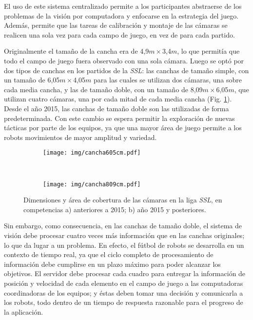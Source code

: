 El uso de este sistema centralizado permite a los participantes abstraerse de
los problemas de la visión por computadora y enfocarse en la estrategia del
juego. Además, permite que las tareas de calibración y montaje de las cámaras se
realicen una sola vez para cada campo de juego, en vez de para cada partido.

Originalmente el tamaño de la cancha era de 4,9$m\times$3,4$m$, lo que permitía
que todo el campo de juego fuera observado con una sola cámara. Luego se optó
por dos tipos de canchas en los partidos de la \emph{SSL}: las canchas de tamaño
simple, con un tamaño de 6,05$m\times$4,05$m$ para las cuales se utilizan dos
cámaras, una sobre cada media cancha, y las de tamaño doble, con un tamaño de
8,09$m\times$6,05$m$, que utilizan cuatro cámaras, una por cada mitad de cada
media cancha (Fig. \ref{cancha}). Desde el año 2015, las canchas de tamaño doble
son las utilizadas de forma predeterminada\cite{sslrules2015}. Con este cambio
se espera permitir la exploración de nuevas tácticas por parte de los equipos,
ya que una mayor área de juego permite a los robots movimientos de mayor
amplitud y variedad.

\begin{figure}[!h]

	\centering

	\begin{subfigure}{0.33652\textwidth}
		\texttt{[image: img/cancha605cm.pdf]}
		\caption{}
	\end{subfigure}
	~
	\begin{subfigure}{0.45\textwidth}
		\texttt{[image: img/cancha809cm.pdf]}
		\caption{}
	\end{subfigure}

	\caption{Dimensiones y área de cobertura de las cámaras en la liga
	\emph{SSL}, en competencias a) anteriores a 2015; b) año 2015 y
	posteriores.}

	\label{cancha}

\end{figure}

Sin embargo, como consecuencia, en las canchas de tamaño doble, el sistema de
visión debe procesar cuatro veces más información que en las canchas originales;
lo que da lugar a un problema. En efecto, el fútbol de robots se desarrolla en
un contexto de tiempo real, ya que el ciclo completo de procesamiento de
información debe cumplirse en un plazo máximo para poder alcanzar los objetivos.
El servidor debe procesar cada cuadro para entregar la información de posición y
velocidad de cada elemento en el campo de juego a las computadoras coordinadoras
de los equipos; y éstas deben tomar una decisión y comunicarla a los robots,
todo dentro de un tiempo de respuesta razonable para el progreso de la
aplicación.

